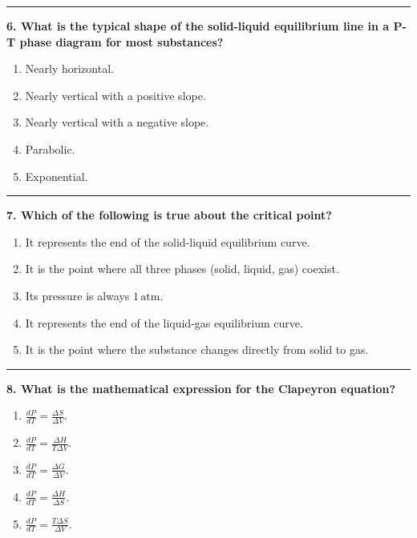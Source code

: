 \documentclass[
  9pt,
]{extbook}
\providecommand{\tightlist}{%
  \setlength{\itemsep}{0pt}\setlength{\parskip}{0pt}}
\theoremstyle{definition}
\theoremstyle{definition}
\theoremstyle{definition}
\theoremstyle{definition}
\theoremstyle{remark}
\begin{document}
\begin{center}\rule{0.5\linewidth}{0.5pt}\end{center}

\textbf{6. What is the typical shape of the solid-liquid equilibrium line in a P-T phase diagram for most substances?}

\begin{enumerate}
\def\labelenumi{\alph{enumi}.}
\tightlist
\item
  Nearly horizontal.
\item
  Nearly vertical with a positive slope.
\item
  Nearly vertical with a negative slope.
\item
  Parabolic.
\item
  Exponential.
\end{enumerate}

\begin{center}\rule{0.5\linewidth}{0.5pt}\end{center}

\textbf{7. Which of the following is true about the critical point?}

\begin{enumerate}
\def\labelenumi{\alph{enumi}.}
\tightlist
\item
  It represents the end of the solid-liquid equilibrium curve.
\item
  It is the point where all three phases (solid, liquid, gas) coexist.
\item
  Its pressure is always \(1\,\text{atm}\).
\item
  It represents the end of the liquid-gas equilibrium curve.
\item
  It is the point where the substance changes directly from solid to gas.
\end{enumerate}

\begin{center}\rule{0.5\linewidth}{0.5pt}\end{center}

\textbf{8. What is the mathematical expression for the Clapeyron equation?}

\begin{enumerate}
\def\labelenumi{\alph{enumi}.}
\tightlist
\item
  \(\frac{dP}{dT} = \frac{\Delta S}{\Delta V}\).
\item
  \(\frac{dP}{dT} = \frac{\Delta H}{T\Delta V}\).
\item
  \(\frac{dP}{dT} = \frac{\Delta G}{\Delta V}\).
\item
  \(\frac{dP}{dT} = \frac{\Delta H}{\Delta S}\).
\item
  \(\frac{dP}{dT} = \frac{T\Delta S}{\Delta V}\).
\end{enumerate}
\end{document}
